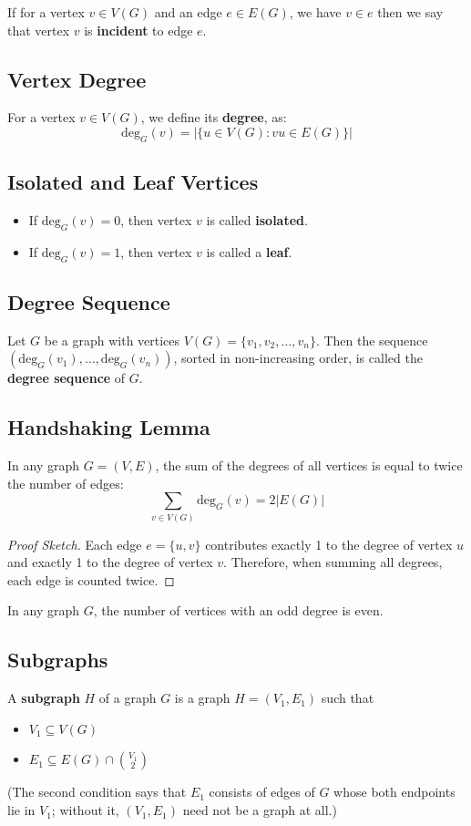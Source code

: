 \documentclass[docmute]{article}
\begin{document}
If for a vertex \(v \in V(G)\) and an edge \(e \in E(G)\), we have \(v \in e\) then we say that vertex \(v\) is \textbf{incident} to edge \(e\).

\subsection*{Vertex Degree}
For a vertex \(v \in V(G)\), we define its \textbf{degree}, as:
\[ \text{deg}_G(v) = |\{u \in V(G) : vu \in E(G)\}| \]

\subsection*{Isolated and Leaf Vertices}
\begin{itemize}
    \item  If \(\text{deg}_G(v) = 0\), then vertex \(v\) is called \textbf{isolated}.
    \item If \(\text{deg}_G(v) = 1\), then vertex \(v\) is called a \textbf{leaf}.
\end{itemize}

 

\subsection*{Degree Sequence}
Let \(G\) be a graph with vertices \(V(G) = \{v_1, v_2, \dots, v_n\}\). Then the sequence \( (\text{deg}_G(v_1),\dots, \text{deg}_G(v_n)) \), sorted in non-increasing order, is called the \textbf{degree sequence} of \(G\).

\subsection*{Handshaking Lemma}
In any graph \(G=(V,E)\), the sum of the degrees of all vertices is equal to twice the number of edges:
\[ \sum_{v \in V(G)} \text{deg}_G(v) = 2|E(G)| \]
\begin{proof}[Proof Sketch]
Each edge \(e = \{u,v\}\) contributes exactly 1 to the degree of vertex \(u\) and exactly 1 to the degree of vertex \(v\). Therefore, when summing all degrees, each edge is counted twice.
\end{proof}

\begin{corollary}
In any graph \(G\), the number of vertices with an odd degree is even.
\end{corollary}

\subsection*{Subgraphs}
A \textbf{subgraph} \(H\) of a graph \(G\) is a graph \(H=(V_1,E_1)\) such that
\begin{itemize}
    \item \(V_1 \subseteq V(G)\)
    \item \(E_1 \subseteq E(G) \cap \binom{V_1}{2}\)
\end{itemize}
(The second condition says that \(E_1\) consists of edges of \(G\) whose both endpoints lie in \(V_1\); without it, \((V_1,E_1)\) need not be a graph at all.)
\end{document}
